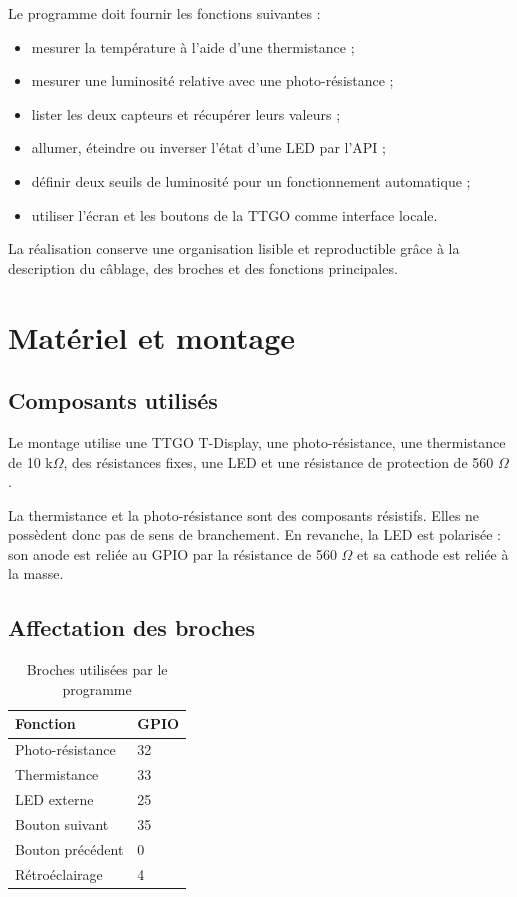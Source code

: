 \documentclass[12pt,a4paper]{report}
\begin{document}
Le programme doit fournir les fonctions suivantes :

\begin{itemize}
  \item mesurer la température à l'aide d'une thermistance ;
  \item mesurer une luminosité relative avec une photo-résistance ;
  \item lister les deux capteurs et récupérer leurs valeurs ;
  \item allumer, éteindre ou inverser l'état d'une LED par l'API ;
  \item définir deux seuils de luminosité pour un fonctionnement automatique ;
  \item utiliser l'écran et les boutons de la TTGO comme interface locale.
\end{itemize}

La réalisation conserve une organisation lisible et reproductible grâce à la
description du câblage, des broches et des fonctions principales.

\section{Matériel et montage}

\subsection{Composants utilisés}

Le montage utilise une TTGO T-Display, une photo-résistance, une thermistance
de 10 k$\Omega$, des résistances fixes, une LED et une résistance de protection
de 560 $\Omega$.

La thermistance et la photo-résistance sont des composants résistifs. Elles ne
possèdent donc pas de sens de branchement. En revanche, la LED est polarisée :
son anode est reliée au GPIO par la résistance de 560 $\Omega$ et sa cathode
est reliée à la masse.

\subsection{Affectation des broches}

\begin{table}[H]
  \centering
  \caption{Broches utilisées par le programme}
  \label{tab:broches}
  \begin{tabular}{ll}
    \toprule
    Fonction & GPIO \\
    \midrule
    Photo-résistance & 32 \\
    Thermistance & 33 \\
    LED externe & 25 \\
    Bouton suivant & 35 \\
    Bouton précédent & 0 \\
    Rétroéclairage & 4 \\
    \bottomrule
  \end{tabular}
\end{table}
\end{document}
